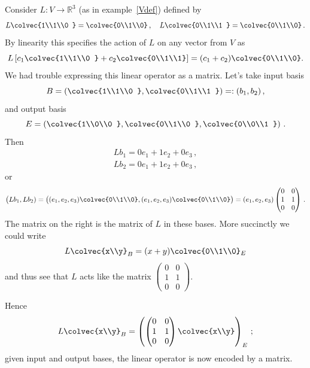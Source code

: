 \begin{example}
Consider 
$L:V\to \mathbb{R}^3$ (as in example~\ref{Vdef}) defined by 
\[
L\colvec{1\\1\\0 } = \colvec{0\\1\\0}\, ,\quad
L\colvec{0\\1\\1 } = \colvec{0\\1\\0}\, .
\]
By linearity this specifies the action of $L$ on any vector from $V$ as
\[
L\left[ c_1\colvec{1\\1\\0 } + c_2 \colvec{0\\1\\1} \right]= (c_1+c_2)\colvec{0\\1\\0}.
\]
We had trouble expressing this linear operator as a matrix. Let's take input basis
\[
B=\left(\colvec{1\\1\\0 } ,\colvec{0\\1\\1 }\right)=:(b_1,b_2)\, ,
\]
and output basis 
\[
E=\left(\colvec{1\\0\\0 } ,\colvec{0\\1\\0 } ,\colvec{0\\0\\1 }\right)\, .
\]
Then
\begin{gather*}
L b_1 = 0 e_1 + 1e_2+ 0  e_3 \, ,\\
L b_2 = 0 e_1 + 1e_2+ 0  e_3 \, ,
\end{gather*}
or 
\[
\big(Lb_1, L b_2) = \big( (e_1,e_2,e_3)\colvec{0\\1\\0}, (e_1,e_2,e_3)\colvec{0\\1\\0}\big)=(e_1,e_2,e_3)\begin{pmatrix}0&0\\1&1\\0&0
\end{pmatrix}\, .
\]
The matrix on the right is the matrix of $L$ in these bases.
More succinctly we could write
\[
L\colvec{x\\y}_B=(x+y) \colvec{0\\1\\0}_E
\]
and thus see that $L$ acts like the matrix 
$
\begin{pmatrix}
0&0\\
1&1\\
0&0
\end{pmatrix}
$.

Hence
\[L\colvec{x\\y}_B
=\left(  \begin{pmatrix}
0&0\\
1&1\\
0&0
\end{pmatrix}
\colvec{x\\y} \right)_E\, ;
\]
given input and output bases, the linear operator is now encoded by a matrix.
\end{example}
